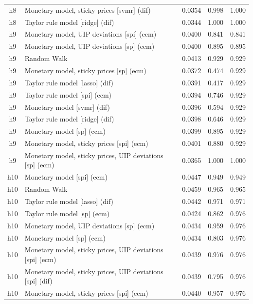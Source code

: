 \begin{ThreePartTable}
\begin{longtable}[t]{cp{5.5cm}ccc}
h8 & \raggedright Monetary model, sticky prices [svmr] (dif) & 0.0354 & 0.998 & 1.000\\
h8 & \raggedright Taylor rule model [ridge] (dif) & 0.0344 & 1.000 & 1.000\\
\addlinespace
h9 & \raggedright Monetary model, UIP deviations [spi] (ecm) & 0.0400 & 0.841 & 0.841\\
h9 & \raggedright Monetary model, UIP deviations [sp] (ecm) & 0.0400 & 0.895 & 0.895\\
h9 & \raggedright Random Walk & 0.0413 & 0.929 & 0.929\\
h9 & \raggedright Monetary model, sticky prices [sp] (ecm) & 0.0372 & 0.474 & 0.929\\
h9 & \raggedright Taylor rule model [lasso] (dif) & 0.0391 & 0.417 & 0.929\\
h9 & \raggedright Taylor rule model [spi] (ecm) & 0.0394 & 0.746 & 0.929\\
h9 & \raggedright Monetary model [svmr] (dif) & 0.0396 & 0.594 & 0.929\\
h9 & \raggedright Taylor rule model [ridge] (dif) & 0.0398 & 0.646 & 0.929\\
h9 & \raggedright Monetary model [sp] (ecm) & 0.0399 & 0.895 & 0.929\\
h9 & \raggedright Monetary model, sticky prices [spi] (ecm) & 0.0401 & 0.880 & 0.929\\
h9 & \raggedright Monetary model, sticky prices, UIP deviations [sp] (ecm) & 0.0365 & 1.000 & 1.000\\
\addlinespace
h10 & \raggedright Monetary model [spi] (ecm) & 0.0447 & 0.949 & 0.949\\
h10 & \raggedright Random Walk & 0.0459 & 0.965 & 0.965\\
h10 & \raggedright Taylor rule model [lasso] (dif) & 0.0442 & 0.971 & 0.971\\
h10 & \raggedright Taylor rule model [sp] (ecm) & 0.0424 & 0.862 & 0.976\\
h10 & \raggedright Monetary model, UIP deviations [sp] (ecm) & 0.0434 & 0.959 & 0.976\\
h10 & \raggedright Monetary model [sp] (ecm) & 0.0434 & 0.803 & 0.976\\
h10 & \raggedright Monetary model, sticky prices, UIP deviations [spi] (ecm) & 0.0439 & 0.976 & 0.976\\
h10 & \raggedright Monetary model, sticky prices, UIP deviations [spi] (dif) & 0.0439 & 0.795 & 0.976\\
h10 & \raggedright Monetary model, sticky prices [spi] (ecm) & 0.0440 & 0.957 & 0.976\\

\end{longtable}
\end{ThreePartTable}
